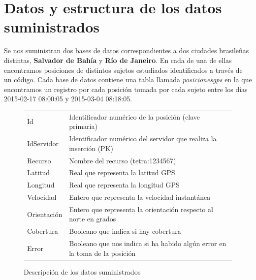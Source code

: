 \documentclass[a4paper, 12pt, spanish]{article}
\begin{document}
\pagebreak

\section{Datos y estructura de los datos suministrados}

Se nos suministran dos bases de datos correspondientes a dos ciudades brasile\~nas distintas, \textbf{Salvador de Bah\'ia} y \textbf{R\'io de Janeiro}. En cada de una de ellas encontramos posiciones de distintos sujetos estudiados identificados a trav\'es de un c\'odigo. Cada base de datos contiene una tabla llamada \textit{posicionesgps} en la que encontramos un registro por cada posici\'on tomada por cada sujeto entre los d\'ias 2015-02-17 08:00:05 y 2015-03-04 08:18:05. \\

\begin{center}
\begin{figure}[H]
	\begin{tabular}{| l | l  |}
	\hline
	\rowcolor{LightCyan}
	\hline
  		\multicolumn{2}{|l|}{Par\'ametros} \\
	\hline
	\hline
	Id & Identificador num\'erico de la posici\'on (clave primaria) \\
	IdServidor & Identificador num\'erico del servidor que realiza la inserci\'on (PK) \\
	Recurso & Nombre del recurso (tetra:1234567) \\
	Latitud & Real que representa la latitud GPS \\
	Longitud & Real que representa la longitud GPS \\
		Velocidad & Entero que representa la velocidad instant\'anea \\
	Orientaci\'on & Entero que representa la orientaci\'on respecto al norte en grados \\
	Cobertura & Booleano que indica si hay cobertura \\
	Error & Booleano que nos indica si ha habido alg\'un error en la toma de la posici\'on \\
	\hline
	\end{tabular}
	\caption{Descripci\'on de los datos suministrados}
\end{figure}
\end{center}

\end{document}
